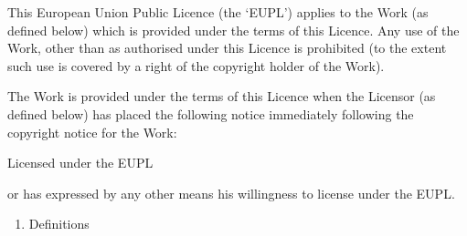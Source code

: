 \documentclass[letterpaper,10pt,english]{sphinxmanual}
\begin{document}
\sphinxAtStartPar
This European Union Public Licence (the ‘EUPL’) applies to the Work (as defined
below) which is provided under the terms of this Licence. Any use of the Work,
other than as authorised under this Licence is prohibited (to the extent such
use is covered by a right of the copyright holder of the Work).

\sphinxAtStartPar
The Work is provided under the terms of this Licence when the Licensor (as
defined below) has placed the following notice immediately following the
copyright notice for the Work:

\begin{sphinxVerbatim}[commandchars=\\\{\}]
    Licensed under the EUPL
\end{sphinxVerbatim}

\sphinxAtStartPar
or has expressed by any other means his willingness to license under the EUPL.
\begin{enumerate}
%
\item {} 
\sphinxAtStartPar
Definitions

\end{enumerate}
\end{document}
